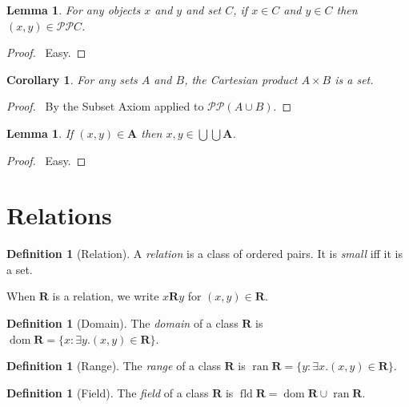 \documentclass{article}
\let\qed\relax
\newtheorem{lemma}[axiom]{Lemma}
\newtheorem{corollary}{Corollary}[axiom]
\theoremstyle{definition}
\newtheorem{definition}[axiom]{Definition}
\newcommand{\dom}{\ensuremath{\operatorname{dom}}}
\newcommand{\fld}{\ensuremath{\operatorname{fld}}}
\newcommand{\ran}{\ensuremath{\operatorname{ran}}}
\begin{document}
    \begin{lemma}
        For any objects $x$ and $y$ and set $C$, if $x \in C$ and $y \in C$ then $(x,y) \in \mathcal{PP} C$.
    \end{lemma}

    \begin{proof}
        \pf\ Easy. \qed
    \end{proof}

    \begin{corollary}
        For any sets $A$ and $B$, the Cartesian product $A \times B$ is a set.
    \end{corollary}

    \begin{proof}
        \pf\ By the Subset Axiom applied to $\mathcal{PP}(A \cup B)$. \qed
    \end{proof}

    \begin{lemma}
        If $(x,y) \in \mathbf{A}$ then $x, y \in \bigcup \bigcup \mathbf{A}$.
    \end{lemma}

    \begin{proof}
        \pf\ Easy. \qed
    \end{proof}

    \section{Relations}

    \begin{definition}[Relation]
        A \emph{relation} is a class of ordered pairs. It is \emph{small} iff it is a set.

        When $\mathbf{R}$ is a relation, we write $x \mathbf{R} y$ for $(x,y) \in \mathbf{R}$.
    \end{definition}

    \begin{definition}[Domain]
        The \emph{domain} of a class $\mathbf{R}$ is $\dom \mathbf{R} = \{ x : \exists y. (x,y) \in \mathbf{R} \}$.
    \end{definition}

    \begin{definition}[Range]
        The \emph{range} of a class $\mathbf{R}$ is $\ran \mathbf{R} = \{ y : \exists x. (x,y) \in \mathbf{R} \}$.
    \end{definition}

    \begin{definition}[Field]
        The \emph{field} of a class $\mathbf{R}$ is $\fld \mathbf{R} = \dom \mathbf{R} \cup \ran \mathbf{R}$.
    \end{definition}
\end{document}
